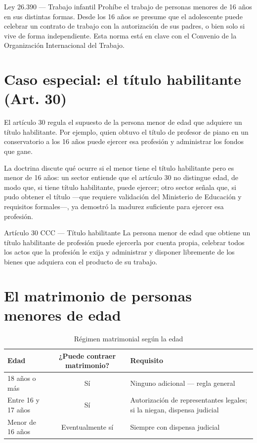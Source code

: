 \documentclass[12pt,oneside]{book}
\begin{document}
\begin{definition}{Ley 26.390 — Trabajo infantil}
Prohíbe el trabajo de personas menores de 16 años en sus distintas formas. Desde los 16 años se presume que el adolescente puede celebrar un contrato de trabajo con la autorización de sus padres, o bien solo si vive de forma independiente. Esta norma está en clave con el Convenio de la Organización Internacional del Trabajo.
\end{definition}

\section{Caso especial: el título habilitante (Art. 30)}

El artículo 30 regula el supuesto de la persona menor de edad que adquiere un título habilitante. Por ejemplo, quien obtuvo el título de profesor de piano en un conservatorio a los 16 años puede ejercer esa profesión y administrar los fondos que gane.

La doctrina discute qué ocurre si el menor tiene el título habilitante pero es menor de 16 años: un sector entiende que el artículo 30 no distingue edad, de modo que, si tiene título habilitante, puede ejercer; otro sector señala que, si pudo obtener el título —que requiere validación del Ministerio de Educación y requisitos formales—, ya demostró la madurez suficiente para ejercer esa profesión.

\begin{definition}{Artículo 30 CCC — Título habilitante}
La persona menor de edad que obtiene un título habilitante de profesión puede ejercerla por cuenta propia, celebrar todos los actos que la profesión le exija y administrar y disponer libremente de los bienes que adquiera con el producto de su trabajo.
\end{definition}

\section{El matrimonio de personas menores de edad}

\begin{table}[H]
\centering
\caption{Régimen matrimonial según la edad}
\begin{tabularx}{\textwidth}{lcX}
\toprule
\textbf{Edad} & \textbf{¿Puede contraer matrimonio?} & \textbf{Requisito} \\
\midrule
18 años o más & Sí & Ninguno adicional — regla general \\
Entre 16 y 17 años & Sí & Autorización de representantes legales; si la niegan, dispensa judicial \\
Menor de 16 años & Eventualmente sí & Siempre con dispensa judicial \\
\bottomrule
\end{tabularx}
\end{table}
\end{document}
